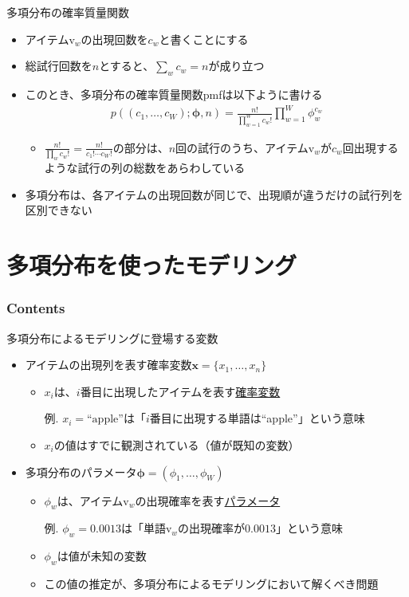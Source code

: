 \documentclass[aspectratio=169,unicode,dvipdfmx,14pt]{beamer}
\begin{document}
\begin{frame}{多項分布の確率質量関数}
\begin{itemize}
\item アイテム$\mbox{v}_w$の出現回数を$c_w$と書くことにする
\item 総試行回数を$n$とすると、$\sum_w c_w = n$が成り立つ
\item このとき、多項分布の確率質量関数pmfは以下ように書ける
\begin{align}
p((c_1,\ldots,c_W);\bm{\phi},n) = \frac{n!}{\prod_{w=1}^W c_w!}\prod_{w=1}^W \phi_w^{c_w}
\end{align}
\begin{itemize}
\item $\frac{n!}{\prod_w c_w!} = \frac{n!}{c_1!\cdots c_W!}$の部分は、$n$回の試行のうち、アイテム$\mbox{v}_w$が$c_w$回出現するような試行の列の総数をあらわしている
\end{itemize}
\item 多項分布は、各アイテムの出現回数が同じで、出現順が違うだけの試行列を区別できない
\end{itemize}
\end{frame}


\section{多項分布を使ったモデリング}

\begin{frame}\frametitle{Contents}
\Large \tableofcontents[currentsection]
\end{frame}

\begin{frame}{多項分布によるモデリングに登場する変数}
\begin{itemize}
\item アイテムの出現列を表す確率変数$\bm{x}=\{x_1,\ldots,x_n\}$
\begin{itemize}
\item $x_i$は、$i$番目に出現したアイテムを表す\underline{確率変数}
\item[例.] $x_i = \mbox{``apple''}$は「$i$番目に出現する単語は``apple''」という意味
\item $x_i$の値はすでに観測されている（値が既知の変数）
\end{itemize}
\item 多項分布のパラメータ$\bm{\phi}=(\phi_1,\ldots,\phi_W)$
\begin{itemize}
\item $\phi_w$は、アイテム$\mbox{v}_w$の出現確率を表す\underline{パラメータ}
\item[例.] $\phi_w=0.0013$は「単語$\mbox{v}_w$の出現確率が$0.0013$」という意味
\item $\phi_w$は値が未知の変数
\item この値の推定が、多項分布によるモデリングにおいて解くべき問題
\end{itemize}
\end{itemize}
\end{frame}
\end{document}

